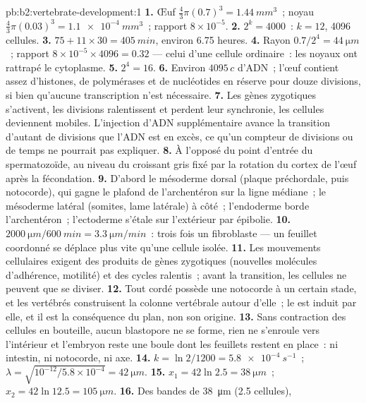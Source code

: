 \begin{solution}{pb:b2:vertebrate-development:1}
\textbf{1.} Œuf $\tfrac43\pi(0.7)^{3} = \qty{1.44}{mm^3}$~; noyau
$\tfrac43\pi(0.03)^{3} = \qty{1.1e-4}{mm^3}$~; rapport $8\times
10^{-5}$.
\textbf{2.} $2^{k} = 4000$~: $k = 12$, 4096 cellules.
\textbf{3.} $75 + 11\times 30 = \qty{405}{min}$, environ 6.75 heures.
\textbf{4.} Rayon $0.7/2^{4} = \qty{44}{\micro m}$~; rapport $8\times
10^{-5}\times 4096 = 0.32$ --- celui d'une cellule ordinaire~: les noyaux
ont rattrapé le cytoplasme.
\textbf{5.} $2^{4} = 16$.
\textbf{6.} Environ $4095\,c$ d'ADN~; l'œuf contient assez d'histones,
de polymérases et de nucléotides en réserve pour douze divisions, si
bien qu'aucune transcription n'est nécessaire.
\textbf{7.} Les gènes zygotiques s'activent, les divisions ralentissent
et perdent leur synchronie, les cellules deviennent mobiles. L'injection
d'ADN supplémentaire avance la transition d'autant de divisions que
l'ADN est en excès, ce qu'un compteur de divisions ou de temps ne
pourrait pas expliquer.
\textbf{8.} À l'opposé du point d'entrée du spermatozoïde, au niveau du
croissant gris fixé par la rotation du cortex de l'œuf après la
fécondation.
\textbf{9.} D'abord le mésoderme dorsal (plaque préchordale, puis
notocorde), qui gagne le plafond de l'archentéron sur la ligne médiane~;
le mésoderme latéral (somites, lame latérale) à côté~; l'endoderme borde
l'archentéron~; l'ectoderme s'étale sur l'extérieur par épibolie.
\textbf{10.} $\qty{2000}{\micro m}/\qty{600}{min} = \qty{3.3}{\micro
m/min}$~: trois fois un fibroblaste --- un feuillet coordonné se déplace
plus vite qu'une cellule isolée.
\textbf{11.} Les mouvements cellulaires exigent des produits de gènes
zygotiques (nouvelles molécules d'adhérence, motilité) et des cycles
ralentis~; avant la transition, les cellules ne peuvent que se diviser.
\textbf{12.} Tout cordé possède une notocorde à un certain stade, et les
vertébrés construisent la colonne vertébrale autour d'elle~; le  est induit par elle, et il est la conséquence du plan, non son
origine.
\textbf{13.} Sans contraction des cellules en bouteille, aucun
blastopore ne se forme, rien ne s'enroule vers l'intérieur et l'embryon
reste une boule dont les feuillets restent en place~: ni intestin, ni
notocorde, ni axe.
\textbf{14.} $k = \ln 2/1200 = \qty{5.8e-4}{s^{-1}}$~; $\lambda =
\sqrt{10^{-12}/5.8\times 10^{-4}} = \qty{42}{\micro m}$.
\textbf{15.} $x_1 = 42\ln 2.5 = \qty{38}{\micro m}$~; $x_2 = 42\ln 12.5
= \qty{105}{\micro m}$.
\textbf{16.} Des bandes de \qty{38}{\micro m} (2.5 cellules),

\end{solution}

